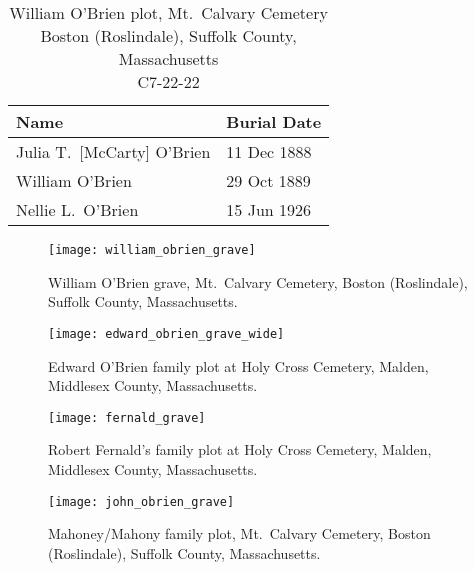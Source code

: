 \clearpage

\begin{table}[ht]
	\centering
	\caption{William O'Brien plot, Mt.\ Calvary Cemetery\cite{William3OBrienBurial} \\
		Boston (Roslindale), Suffolk County, Massachusetts\\
		C7-22-22}
	\begin{tabular}{|l|l|}
		\hline
		\textbf{Name} & \textbf{Burial Date} \\
		\hline
		Julia T.\ [McCarty] O'Brien\index{McCarty!Julia T.}\index{O'Brien!Julia T.\ (McCarty)} & 11 Dec 1888 \\
		\hline
		William O'Brien\index{O'Brien!William\textsuperscript{3}} & 29 Oct 1889 \\
		\hline
		Nellie L.\ O'Brien\index{O'Brien!Ellen/Nellie Louise\textsuperscript{4}} & 15 Jun 1926 \\
		\hline
	\end{tabular}
\end{table}

\clearpage

\begin{figure}[p]
	\centering
	\texttt{[image: william\_obrien\_grave]}
	\caption{William O'Brien grave, Mt.\ Calvary Cemetery, Boston (Roslindale), Suffolk County, Massachusetts.}
	\label{fig:WilliamOBrienGrave}
\end{figure}

\begin{figure}[p]
	\centering
	\texttt{[image: edward\_obrien\_grave\_wide]}
	\caption{Edward O'Brien family plot at Holy Cross Cemetery, Malden, Middlesex County, Massachusetts.}
	\label{fig:EdwardOBrienGrave}
\end{figure}

\begin{figure}[p]
	\centering
	\texttt{[image: fernald\_grave]}
	\caption{Robert Fernald's family plot at Holy Cross Cemetery, Malden, Middlesex County, Massachusetts.}
	\label{fig:FernaldGrave}
\end{figure}

\begin{figure}[p]
	\centering
	\texttt{[image: john\_obrien\_grave]}
	\caption{Mahoney/Mahony family plot, Mt.\ Calvary Cemetery, Boston (Roslindale), Suffolk County, Massachusetts.}
	\label{fig:MahoneyPlot}
\end{figure}

